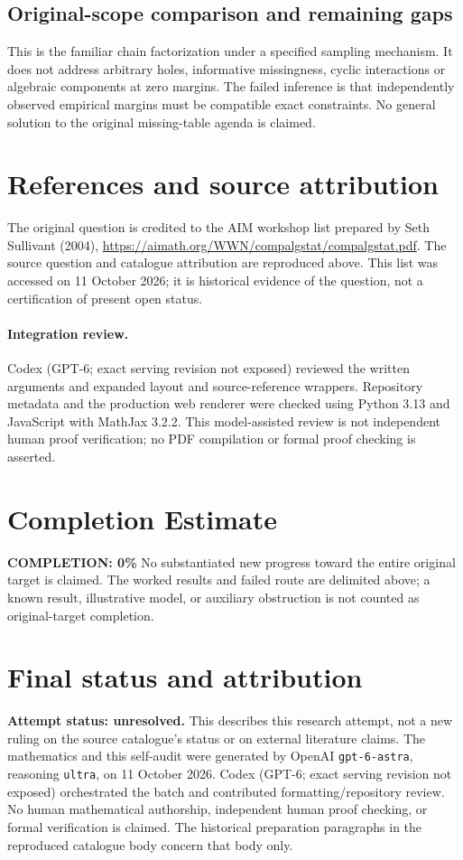 \documentclass[11pt]{article}
\begin{document}
\subsection{Original-scope comparison and remaining gaps}
This is the familiar chain factorization under a specified sampling mechanism. It does not address arbitrary holes, informative missingness, cyclic interactions or algebraic components at zero margins. The failed inference is that independently observed empirical margins must be compatible exact constraints. No general solution to the original missing-table agenda is claimed.

\section{References and source attribution}
The original question is credited to the AIM workshop list prepared by Seth Sullivant (2004), \url{https://aimath.org/WWN/compalgstat/compalgstat.pdf}. The source question and catalogue attribution are reproduced above. This list was accessed on 11 October 2026; it is historical evidence of the question, not a certification of present open status.


\paragraph{Integration review.} Codex (GPT-6; exact serving revision not exposed) reviewed the written arguments and expanded layout and source-reference wrappers. Repository metadata and the production web renderer were checked using Python 3.13 and JavaScript with MathJax 3.2.2. This model-assisted review is not independent human proof verification; no PDF compilation or formal proof checking is asserted.

\section{Completion Estimate}
\noindent\textbf{COMPLETION: 0\%}
No substantiated new progress toward the entire original target is claimed. The worked results and failed route are delimited above; a known result, illustrative model, or auxiliary obstruction is not counted as original-target completion.

\section{Final status and attribution}
\textbf{Attempt status: unresolved.} This describes this research attempt, not a new ruling on the source catalogue's status or on external literature claims.
The mathematics and this self-audit were generated by OpenAI \texttt{gpt-6-astra}, reasoning \texttt{ultra}, on 11 October 2026. Codex (GPT-6; exact serving revision not exposed) orchestrated the batch and contributed formatting/repository review. No human mathematical authorship, independent human proof checking, or formal verification is claimed. The historical preparation paragraphs in the reproduced catalogue body concern that body only.
\end{document}
